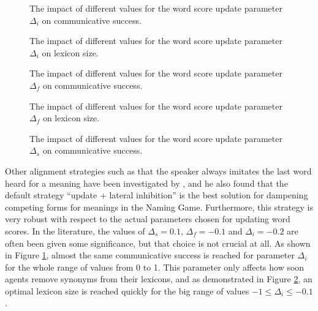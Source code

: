 \startfiguregroup

\begin{figure}[t]
  \caption{The impact of different values for the word score update
    parameter $\Delta_i$ on communicative success.}
  \label{f:ng-alignment-delta-inhibit-vs-communicative-success}
\end{figure}

\begin{figure}[t]
  \label{f:ng-alignment-delta-inhibit-vs-lexicon-size}
  \caption{The impact of different values for the word score update
    parameter $\Delta_i$ on lexicon size.}
\end{figure}

\begin{figure}[t]
  \label{f:ng-alignment-delta-fail-vs-communicative-success}
  \caption{The impact of different values for the word score update
    parameter $\Delta_f$ on communicative success.}
\end{figure}

\begin{figure}[t]
  \label{f:ng-alignment-delta-fail-vs-lexicon-size}
  \caption{The impact of different values for the word score update
    parameter $\Delta_f$ on lexicon size.}
\end{figure}

\begin{figure}[t]
  \label{f:ng-alignment-delta-success-vs-communicative-success}
  \caption{The impact of different values for the word score update
    parameter $\Delta_s$ on communicative success.}
\end{figure}

\stopfiguregroup

\noindent Other alignment strategies such as that the speaker always
imitates the last word heard for a meaning have been investigated by
\cite{kaplan05simple}, and he also found that the default strategy
``update + lateral inhibition'' is the best solution for dampening
competing forms for meanings in the Naming Game. Furthermore, this
strategy is very robust with respect to the actual parameters chosen
for updating word scores. In the literature, the values of
$\Delta_s=0.1$, $\Delta_f=-0.1$ and $\Delta_i=-0.2$ are often been
given some significance, but that choice is not crucial at all. As
shown in Figure
\ref{f:ng-alignment-delta-inhibit-vs-communicative-success}, almost
the same communicative success is reached for parameter $\Delta_i$ for
the whole range of values from 0 to 1. This parameter only affects how
soon agents remove synonyms from their lexicons, and as demonstrated
in Figure \ref{f:ng-alignment-delta-inhibit-vs-lexicon-size}, an
optimal lexicon size is reached quickly for the big range of values
$-1 \leq \Delta_i \leq -0.1$. 

